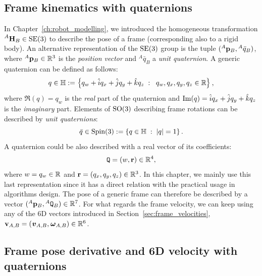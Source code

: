 \subsection{Frame kinematics with quaternions}
\label{sec:frame_kinematics_quaternion}

In Chapter~\ref{ch:robot_modelling}, we introduced the homogeneous transformation $\homo[A]_B \in \SE(3)$ to describe the pose of a frame (corresponding also to a rigid body).
An alternative representation of the $\SE(3)$ group is the tuple $(\pos[A]_B, {}^A \bar{q}_B)$, where $\pos[A]_B \in \realn^3$ is the \emph{position vector} and ${}^A \bar{q}_B$ a \emph{unit quaternion}.
A generic quaternion can be defined as follows:
%
\begin{equation*}
    q \in \mathbb{H} := \left\{ q_w + \hat{i} q_x + \hat{j} q_y + \hat{k} q_z \;:\;\; q_w, q_x, q_y, q_z \in \realn \right\}
    ,
\end{equation*}
%
where $\Re(q) = q_w$ is the \emph{real} part of the quaternion and $\Imag(q) = \hat{i} q_x + \hat{j} q_y + \hat{k} q_z$ is the \emph{imaginary} part.
Elements of $\SO(3)$ describing frame rotations can be described by \emph{unit quaternions}:
%
\begin{equation*}
    \bar{q} \in \Spin(3) := \left\{ q \in \mathbb{H} \;:\; |q| = 1 \right\}
    .
\end{equation*}
%
A quaternion could be also described with a real vector of its coefficients:
%
\begin{equation*}
    \quat = (w, \mathbf{r}) \in \realn^4
    ,
\end{equation*}
%
where $w = q_w \in \realn$ and $\mathbf{r} = (q_x, q_y, q_z) \in \realn^3$.
In this chapter, we mainly use this last representation since it has a direct relation with the practical usage in algorithms design.
The pose of a generic frame can therefore be described by a vector $(\pos[A]_B, \quat[A]_B) \in \realn^7$.
%
For what regards the frame velocity, we can keep using any of the 6D vectors introduced in Section~\ref{sec:frame_velocities}, \ie $\velsix_{A,B} = (\vellin_{A,B}, \velang_{A,B}) \in \realn^6$.

\subsection{Frame pose derivative and 6D velocity with quaternions}

